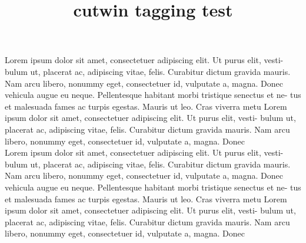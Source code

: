 \documentclass{article}
\title{cutwin tagging test}
\begin{document}
\opencutleft
\begin{cutout}{5}{0pt}{0.5\textwidth}{10}
   Lorem ipsum dolor sit amet, consectetuer adipiscing elit. Ut purus elit, vesti-
   bulum ut, placerat ac, adipiscing vitae, felis. Curabitur dictum gravida mauris.
   Nam arcu libero, nonummy eget, consectetuer id, vulputate a, magna. Donec
   vehicula augue eu neque. Pellentesque habitant morbi tristique senectus et ne-
   tus et malesuada fames ac turpis egestas. Mauris ut leo. Cras viverra metu
   Lorem ipsum dolor sit amet, consectetuer adipiscing elit. Ut purus elit, vesti-
   bulum ut, placerat ac, adipiscing vitae, felis. Curabitur dictum gravida mauris.
   Nam arcu libero, nonummy eget, consectetuer id, vulputate a, magna. Donec\\

   Lorem ipsum dolor sit amet, consectetuer adipiscing elit. Ut purus elit, vesti-
   bulum ut, placerat ac, adipiscing vitae, felis. Curabitur dictum gravida mauris.
   Nam arcu libero, nonummy eget, consectetuer id, vulputate a, magna. Donec
   vehicula augue eu neque. Pellentesque habitant morbi tristique senectus et ne-
   tus et malesuada fames ac turpis egestas. Mauris ut leo. Cras viverra metu
   Lorem ipsum dolor sit amet, consectetuer adipiscing elit. Ut purus elit, vesti-
   bulum ut, placerat ac, adipiscing vitae, felis. Curabitur dictum gravida mauris.
   Nam arcu libero, nonummy eget, consectetuer id, vulputate a, magna. Donec
\end{cutout}
\end{document}
